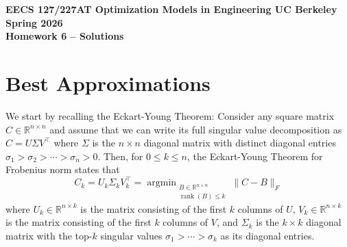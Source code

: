 \documentclass[10pt]{article}
\theoremstyle{definition}
\theoremstyle{plain}
\newcommand{\RR}{\mathbb{R}}
\DeclareMathOperator{\rank}{rank}
\DeclareMathOperator*{\argmin}{argmin}
\begin{document}
\begin{center}
    {\large\bfseries EECS 127/227AT \quad Optimization Models in Engineering \quad UC Berkeley \quad Spring 2026}\\[1ex]
    {\LARGE\bfseries Homework 6 -- Solutions}
\end{center}

\section{Best Approximations}

We start by recalling the Eckart-Young Theorem: Consider any square matrix $C \in \RR^{n \times n}$ and assume that we can write its full singular value decomposition as $C = U\Sigma V^\top$ where $\Sigma$ is the $n \times n$ diagonal matrix with distinct diagonal entries $\sigma_1 > \sigma_2 > \cdots > \sigma_n > 0$. Then, for $0 \le k \le n$, the Eckart-Young Theorem for Frobenius norm states that
\[
    C_k = U_k \Sigma_k V_k^\top = \argmin_{\substack{B \in \RR^{n \times n} \\ \rank(B) \le k}} \|C - B\|_F
\]
where $U_k \in \RR^{n \times k}$ is the matrix consisting of the first $k$ columns of $U$, $V_k \in \RR^{n \times k}$ is the matrix consisting of the first $k$ columns of $V$, and $\Sigma_k$ is the $k \times k$ diagonal matrix with the top-$k$ singular values $\sigma_1 > \cdots > \sigma_k$ as its diagonal entries.
\end{document}
